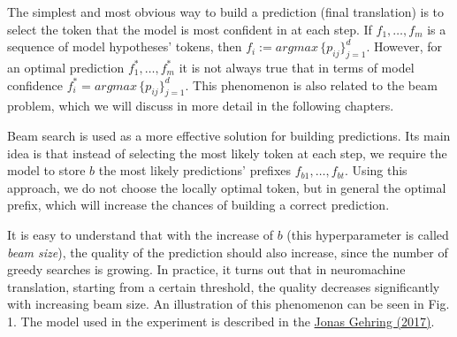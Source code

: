\documentclass[a4paper,14pt]{extarticle}
\newcommand{\bibref}[3]{\hyperlink{#1}{#2 (#3)}}
\begin{document}
	The simplest and most obvious way to build a prediction (final translation) is to select the token that the model is most confident in at each step. If $f_1, \dots, f_m$ is a sequence of model hypotheses' tokens, then $f_i := argmax \, \{p_{ij}\}_{j=1}^{d}$. However, for an optimal prediction $f_1^*, \dots, f_m^*$ it is not always true that in terms of model confidence $f_i^* = argmax \, \{p_{ij}\}_{j=1}^{d}$. This phenomenon is also related to the beam problem, which we will discuss in more detail in the following chapters.
	
	Beam search is used as a more effective solution for building predictions. Its main idea is that instead of selecting the most likely token at each step, we require the model to store $b$ the most likely predictions' prefixes $f_{b1}, \dots, f_{bt}$. Using this approach, we do not choose the locally optimal token, but in general the optimal prefix, which will increase the chances of building a correct prediction.

	It is easy to understand that with the increase of $b$ (this hyperparameter is called \textit{beam size}), the quality of the prediction should also increase, since the number of greedy searches is growing. In practice, it turns out that in neuromachine translation, starting from a certain threshold, the quality decreases significantly with increasing beam size. An illustration of this phenomenon can be seen in Fig. 1. The model used in the experiment is described in the  \bibref{fconv}{Jonas Gehring}{2017}. 
	
	\begin{figure}[t]
	\end{figure}
	
\end{document}
